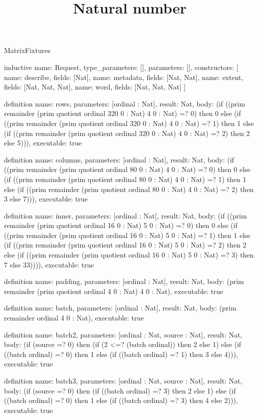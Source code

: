 \begin{lexlean}{MatrixFixtures}
\title{Natural number}
\begin{semanticmodule}
inductive{
  name: Request,
  type_parameters: [],
  parameters: [],
  constructors: [
    {name: describe, fields: [Nat]},
    {name: metadata, fields: [Nat, Nat]},
    {name: extent, fields: [Nat, Nat, Nat]},
    {name: word, fields: [Nat, Nat, Nat]}
  ]
}

definition{
  name: rows,
  parameters: [ordinal : Nat],
  result: Nat,
  body: (if ((prim remainder (prim quotient ordinal 320 0 : Nat) 4 0 : Nat) =? 0) then 0 else (if ((prim remainder (prim quotient ordinal 320 0 : Nat) 4 0 : Nat) =? 1) then 1 else (if ((prim remainder (prim quotient ordinal 320 0 : Nat) 4 0 : Nat) =? 2) then 2 else 5))),
  executable: true
}

definition{
  name: columns,
  parameters: [ordinal : Nat],
  result: Nat,
  body: (if ((prim remainder (prim quotient ordinal 80 0 : Nat) 4 0 : Nat) =? 0) then 0 else (if ((prim remainder (prim quotient ordinal 80 0 : Nat) 4 0 : Nat) =? 1) then 1 else (if ((prim remainder (prim quotient ordinal 80 0 : Nat) 4 0 : Nat) =? 2) then 3 else 7))),
  executable: true
}

definition{
  name: inner,
  parameters: [ordinal : Nat],
  result: Nat,
  body: (if ((prim remainder (prim quotient ordinal 16 0 : Nat) 5 0 : Nat) =? 0) then 0 else (if ((prim remainder (prim quotient ordinal 16 0 : Nat) 5 0 : Nat) =? 1) then 1 else (if ((prim remainder (prim quotient ordinal 16 0 : Nat) 5 0 : Nat) =? 2) then 2 else (if ((prim remainder (prim quotient ordinal 16 0 : Nat) 5 0 : Nat) =? 3) then 7 else 33)))),
  executable: true
}

definition{
  name: padding,
  parameters: [ordinal : Nat],
  result: Nat,
  body: (prim remainder (prim quotient ordinal 4 0 : Nat) 4 0 : Nat),
  executable: true
}

definition{
  name: batch,
  parameters: [ordinal : Nat],
  result: Nat,
  body: (prim remainder ordinal 4 0 : Nat),
  executable: true
}

definition{
  name: batch2,
  parameters: [ordinal : Nat, source : Nat],
  result: Nat,
  body: (if (source =? 0) then (if (2 <=? (batch ordinal)) then 2 else 1) else (if ((batch ordinal) =? 0) then 1 else (if ((batch ordinal) =? 1) then 3 else 4))),
  executable: true
}

definition{
  name: batch3,
  parameters: [ordinal : Nat, source : Nat],
  result: Nat,
  body: (if (source =? 0) then (if ((batch ordinal) =? 3) then 2 else 1) else (if ((batch ordinal) =? 0) then 1 else (if ((batch ordinal) =? 3) then 4 else 2))),
  executable: true
}


\end{semanticmodule}
\end{lexlean}
